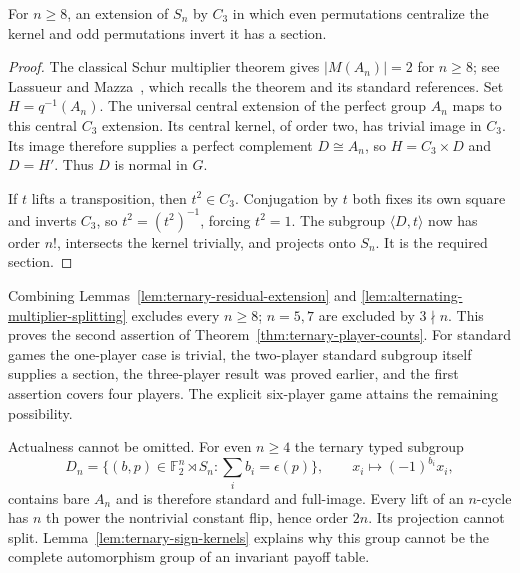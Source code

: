 \begin{lemma}\label{lem:alternating-multiplier-splitting}
For $n\geq8$, an extension of $S_n$ by $C_3$ in which even permutations
centralize the kernel and odd permutations invert it has a section.
\end{lemma}
\begin{proof}
The classical Schur multiplier theorem gives $|M(A_n)|=2$ for $n\geq8$;
see Lassueur and Mazza~\cite[Section~3]{LassueurMazza2015}, which recalls the theorem and its
standard references. Set $H=q^{-1}(A_n)$. The universal central extension
of the perfect group $A_n$ maps to this central $C_3$ extension. Its
central kernel, of order two, has trivial image in $C_3$. Its image
therefore supplies a perfect complement $D\cong A_n$, so
$H=C_3\times D$ and $D=H'$. Thus $D$ is normal in $G$.

If $t$ lifts a transposition, then $t^2\in C_3$. Conjugation by $t$
both fixes its own square and inverts $C_3$, so $t^2=(t^2)^{-1}$,
forcing $t^2=1$. The subgroup $\langle D,t\rangle$ now has order $n!$,
intersects the kernel trivially, and projects onto $S_n$. It is the
required section.
\end{proof}

Combining Lemmas~\ref{lem:ternary-residual-extension} and
\ref{lem:alternating-multiplier-splitting} excludes every $n\geq8$;
$n=5,7$ are excluded by $3\nmid n$. This proves the second assertion of
Theorem~\ref{thm:ternary-player-counts}. For standard games the one-player
case is trivial, the two-player standard subgroup itself supplies a
section, the three-player result was proved earlier, and the first
assertion covers four players. The explicit six-player game attains the
remaining possibility.

Actualness cannot be omitted. For even $n\geq4$ the ternary typed subgroup
\[
 D_n=\{(b,p)\in\mathbb F_2^n\rtimes S_n:
              \textstyle\sum_i b_i=\epsilon(p)\},
 \qquad x_i\mapsto(-1)^{b_i}x_i,
\]
contains bare $A_n$ and is therefore standard and full-image. Every lift
of an $n$-cycle has $n$ th power the nontrivial constant flip, hence order
$2n$. Its projection cannot split. Lemma~\ref{lem:ternary-sign-kernels}
explains why this group cannot be the complete automorphism group of an
invariant payoff table.
